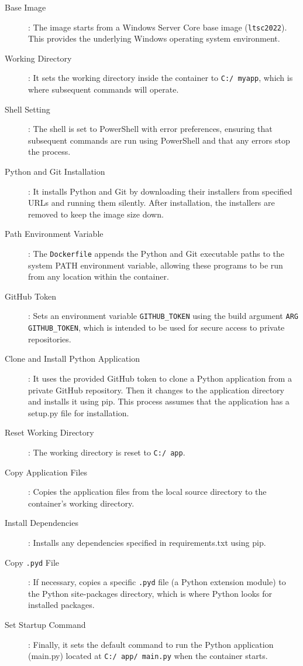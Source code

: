 \documentclass{article}
\begin{document}
\begin{description}
\item[Base Image]: The image starts from a Windows Server Core base image (\texttt{ltsc2022}). This provides the underlying Windows operating system environment.

\item[Working Directory]: It sets the working directory inside the container to \texttt{C:/\ myapp}, which is where subsequent commands will operate.

\item[Shell Setting]: The shell is set to PowerShell with error preferences, ensuring that subsequent commands are run using PowerShell and that any errors stop the process.

\item[Python and Git Installation]: It installs Python and Git by downloading their installers from specified URLs and running them silently. After installation, the installers are removed to keep the image size down.

\item[Path Environment Variable]: The \texttt{Dockerfile} appends the Python and Git executable paths to the system PATH environment variable, allowing these programs to be run from any location within the container.

\item[GitHub Token]: Sets an environment variable \texttt{GITHUB\_TOKEN} using the build argument \texttt{ARG GITHUB\_TOKEN}, which is intended to be used for secure access to private repositories.

\item[Clone and Install Python Application]: It uses the provided GitHub token to clone a Python application from a private GitHub repository. Then it changes to the application directory and installs it using pip. This process assumes that the application has a setup.py file for installation.

\item[Reset Working Directory]: The working directory is reset to \texttt{C:/\ app}.

\item[Copy Application Files]: Copies the application files from the local source directory to the container's working directory.

\item[Install Dependencies]: Installs any dependencies specified in requirements.txt using pip.

\item[Copy \texttt{.pyd} File]: If necessary, copies a specific \texttt{.pyd} file (a Python extension module) to the Python site-packages directory, which is where Python looks for installed packages.

\item[Set Startup Command]: Finally, it sets the default command to run the Python application (main.py) located at \texttt{C:/\ app/\ main.py} when the container starts.
\end{description}
\end{document}

